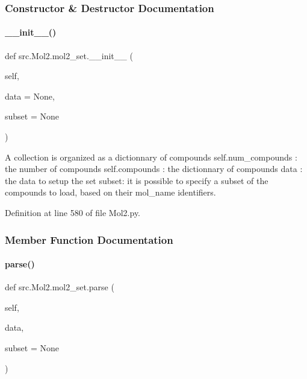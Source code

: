 \subsubsection{Constructor \& Destructor Documentation}
\mbox{\label{classsrc_1_1Mol2_1_1mol2__set_a9228a97620cf4de034a2102d83c83a07}} 
\paragraph{\texorpdfstring{\+\_\+\+\_\+init\+\_\+\+\_\+()}{\_\_init\_\_()}}
{\footnotesize\ttfamily def src.\+Mol2.\+mol2\+\_\+set.\+\_\+\+\_\+init\+\_\+\+\_\+ (\begin{DoxyParamCaption}\item[{}]{self,  }\item[{}]{data = {\ttfamily None},  }\item[{}]{subset = {\ttfamily None} }\end{DoxyParamCaption})}



A collection is organized as a dictionnary of compounds self.\+num\+\_\+compounds \+: the number of compounds self.\+compounds \+: the dictionnary of compounds data \+: the data to setup the set subset\+: it is possible to specify a subset of the compounds to load, based on their mol\+\_\+name identifiers. 



Definition at line 580 of file Mol2.\+py.



\subsubsection{Member Function Documentation}
\mbox{\label{classsrc_1_1Mol2_1_1mol2__set_a3f0f1e1c4b0aa522161e0aeeda3d08d7}} 
\paragraph{\texorpdfstring{parse()}{parse()}}
{\footnotesize\ttfamily def src.\+Mol2.\+mol2\+\_\+set.\+parse (\begin{DoxyParamCaption}\item[{}]{self,  }\item[{}]{data,  }\item[{}]{subset = {\ttfamily None} }\end{DoxyParamCaption})}



